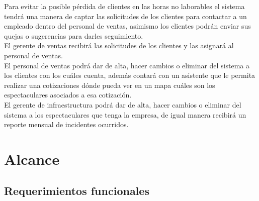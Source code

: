 Para evitar la posible pérdida de clientes en las horas no laborables el sistema tendrá una manera de captar las solicitudes de los clientes para contactar a un empleado dentro del personal de ventas, asimismo los clientes podrán enviar sus quejas o sugerencias para darles seguimiento.\\

El gerente de ventas recibirá las solicitudes de los clientes y las asignará al personal de ventas.\\

El personal de ventas podrá dar de alta, hacer cambios o eliminar del sistema a los clientes con los cuáles cuenta, además contará con un asistente que le permita realizar una cotizaciones dónde pueda ver en un mapa cuáles son los espectaculares asociados a esa cotización.\\

El gerente de infraestructura podrá dar de alta, hacer cambios o eliminar del sistema a los espectaculares que tenga la empresa, de igual manera recibirá un reporte mensual de incidentes ocurridos.\\


\section{Alcance}

\subsection{Requerimientos funcionales}

